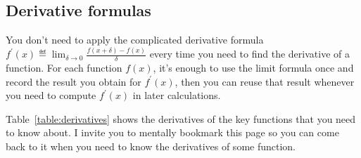 \vspace{-4mm}	%

	\subsection{Derivative formulas}

		You don't need to apply the complicated derivative formula
		$f^{\prime\!}(x) \eqdef \lim_{\delta \to 0}\frac{f(x+\delta)-f(x)}{\delta}$
		every time you need to find the derivative of a function.
		For each function $f(x)$,
		it's enough to use the limit formula once
		and record the result you obtain for $f^{\prime\!}(x)$,
		then you can reuse that result
		whenever you need to compute $f^{\prime\!}(x)$ in later calculations.

		Table~\ref{table:derivatives} shows the derivatives of the key functions
		that you need to know about.
		I invite you to mentally bookmark this page so you can come back to it
		when you need to know the derivatives of some function.

